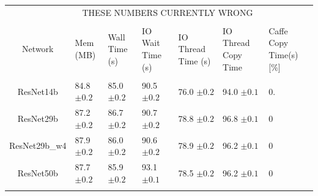 \documentclass[11pt,a4paper]{article}
\begin{document}
\par \noindent
\vspace{2 mm}
\begin{minipage}{\linewidth}
\centering
{} \label{tab:resnetComput} 
\begin{tabular}{cllllll}
 & \multicolumn{5}{c}{THESE NUMBERS CURRENTLY WRONG} \\
\cline{2-6}
\vspace{-0.1in}\\
\vspace{0.05in}
Network & Mem (MB) & Wall Time (s) & IO Wait Time (s) & IO Thread Time (s) & IO Thread Copy Time & Caffe Copy Time(s) [\%] \\
\hline 
\vspace{-0.1in}\\
\vspace{0.05in}
 ResNet14b & 84.8 $\pm 0.2$ & 85.0 $\pm 0.2$  & 90.5 $\pm 0.2$ & 76.0 $\pm 0.2$ & 94.0 $\pm 0.1$ & 0. \\ 
 \vspace{0.05in}
 ResNet29b & 87.2 $\pm 0.2$ & 86.7 $\pm 0.2$  & 90.7 $\pm 0.2$ & 78.8 $\pm 0.2$ & 96.8 $\pm 0.1$ & 0 \\ 
 \vspace{0.05in}
 ResNet29b\_w4 & 87.9 $\pm 0.2 $ & 86.0 $\pm 0.2$  & 90.6 $\pm 0.2$ & 78.9 $\pm 0.2$ & 96.2 $\pm 0.1$ & 0 \\ 
 \vspace{0.05in}
 ResNet50b & 87.7 $\pm 0.2$ & 85.9 $\pm 0.2$  & 93.1 $\pm 0.1$ & 78.5 $\pm 0.2$ & 96.2 $\pm 0.1$ & 0\\ 
 \vspace{0.05in}
    \end{tabular}
\end{minipage}
\end{document}
